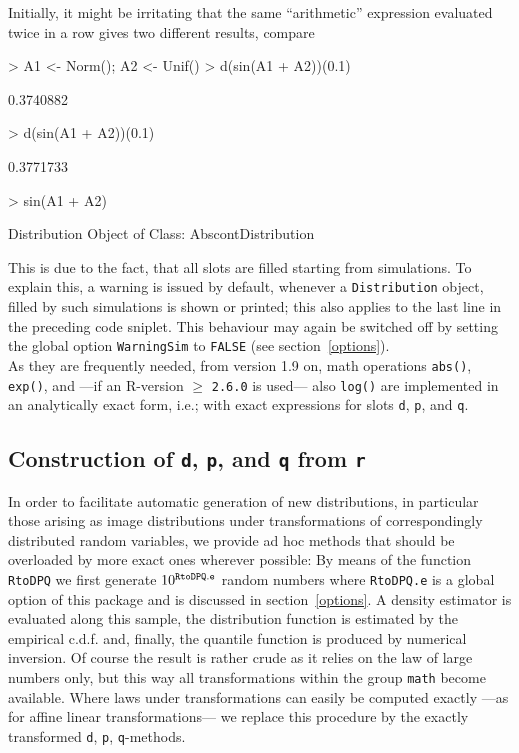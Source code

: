 \documentclass[11pt]{article}
\newcommand{\code}[1]{{\tt #1}}
\begin{document}
Initially, it might be irritating that the same ``arithmetic'' expression
evaluated twice in a row gives two different results, compare
\begin{Schunk}
\begin{Sinput}
>   A1 <- Norm(); A2 <- Unif()
>   d(sin(A1 + A2))(0.1)
\end{Sinput}
\begin{Soutput}
[1] 0.3740882
\end{Soutput}
\begin{Sinput}
>   d(sin(A1 + A2))(0.1)
\end{Sinput}
\begin{Soutput}
[1] 0.3771733
\end{Soutput}
\begin{Sinput}
>   sin(A1 + A2)
\end{Sinput}
\begin{Soutput}
Distribution Object of Class: AbscontDistribution
\end{Soutput}
\end{Schunk}
This is due to the fact, that all slots are filled starting from simulations.
To explain this, a warning is issued  by default, whenever a \code{Distribution}
object, filled by such simulations is shown or printed; this also applies to the 
last line in the preceding code sniplet. This behaviour may again be switched 
off by setting the global option
\code{WarningSim} to \code{FALSE} (see section~\ref{options}).\\

As they are frequently needed, from version 1.9 on, math operations 
\code{abs()}, \code{exp()}, and ---if an {\sf R}-version $\ge$ {\tt 2.6.0} is 
used--- also \code{log()} are implemented in an analytically exact form, 
i.e.; with exact expressions for slots \code{d}, \code{p}, and \code{q}.

%
\subsection{Construction of \code{d}, \code{p}, and \code{q} from \code{r}}
%
In order to facilitate automatic generation of new distributions, in particular 
those arising as image distributions under transformations of correspondingly 
distributed random variables, we provide ad hoc methods that should be 
overloaded by more exact ones wherever possible: By means of the function 
\code{RtoDPQ} we first generate $10^{\footnotesize\tt RtoDPQ.e}$
random numbers where \code{RtoDPQ.e} is a global option of this package and is 
discussed in section~{\ref{options}}. %
A density estimator is evaluated along this sample, the distribution function is 
estimated by the empirical c.d.f. and, finally, the quantile function is 
produced by numerical inversion.
Of course the result is rather crude as it relies on the law of large numbers 
only, but this way all transformations within the group \code{math} become 
available.
Where laws under transformations can easily be computed exactly ---as for affine
linear transformations--- we replace this procedure by the exactly transformed
\code{d}, \code{p}, \code{q}-methods.
%
\end{document}
